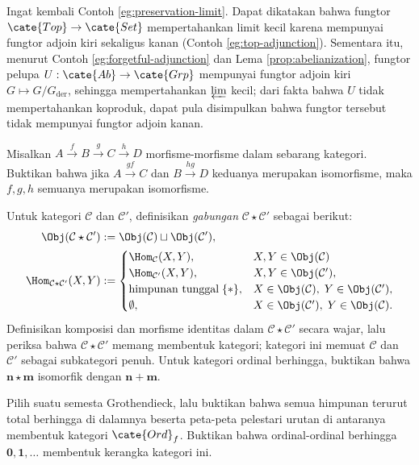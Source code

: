Ingat kembali Contoh \ref{eg:preservation-limit}. Dapat dikatakan bahwa fungtor $\cate{Top} \to \cate{Set}$ mempertahankan limit kecil karena mempunyai fungtor adjoin kiri sekaligus kanan (Contoh \ref{eg:top-adjunction}). Sementara itu, menurut Contoh \ref{eg:forgetful-adjunction} dan Lema \ref{prop:abelianization}, fungtor pelupa $U: \cate{Ab} \to \cate{Grp}$ mempunyai fungtor adjoin kiri $G \mapsto G/G_\text{der}$, sehingga mempertahankan $\varprojlim$ kecil; dari fakta bahwa $U$ tidak mempertahankan koproduk, dapat pula disimpulkan bahwa fungtor tersebut tidak mempunyai fungtor adjoin kanan.

\begin{Exercises}
	\item Misalkan $A \xrightarrow{f} B \xrightarrow{g} C \xrightarrow{h} D$ morfisme-morfisme dalam sebarang kategori. Buktikan bahwa jika $A \xrightarrow{gf} C$ dan $B \xrightarrow{hg} D$ keduanya merupakan isomorfisme, maka $f,g,h$ semuanya merupakan isomorfisme.
	\item Untuk kategori $\mathcal{C}$ dan $\mathcal{C}'$, definisikan \emph{gabungan} $\mathcal{C} \star \mathcal{C}'$ sebagai berikut:
		\begin{align*}
			\Obj(\mathcal{C} \star \mathcal{C}') & := \Obj(\mathcal{C}) \sqcup \Obj(\mathcal{C}'), \\
			\Hom_{\mathcal{C} \star \mathcal{C}'}(X, Y) & := \begin{cases}
				\Hom_{\mathcal{C}}(X, Y), & X, Y \in \Obj(\mathcal{C}) \\
				\Hom_{\mathcal{C}'}(X, Y), & X, Y \in \Obj(\mathcal{C}'), \\
				\text{himpunan tunggal}\; \{\ast\}, & X \in \Obj(\mathcal{C}), \; Y \in \Obj(\mathcal{C}'), \\
				\emptyset, & X \in \Obj(\mathcal{C}'), \; Y \in \Obj(\mathcal{C}).
			\end{cases}
		\end{align*}
		Definisikan komposisi dan morfisme identitas dalam $\mathcal{C} \star \mathcal{C}'$ secara wajar, lalu periksa bahwa $\mathcal{C} \star \mathcal{C}'$ memang membentuk kategori; kategori ini memuat $\mathcal{C}$ dan $\mathcal{C}'$ sebagai subkategori penuh. Untuk kategori ordinal berhingga, buktikan bahwa $\mathbf{n} \star \mathbf{m}$ isomorfik dengan $\mathbf{n+m}$.
	\item Pilih suatu semesta Grothendieck, lalu buktikan bahwa semua himpunan terurut total berhingga di dalamnya beserta peta-peta pelestari urutan di antaranya membentuk kategori $\cate{Ord}_f$. Buktikan bahwa ordinal-ordinal berhingga $\mathbf{0}, \mathbf{1}, \ldots$ membentuk kerangka kategori ini.

\end{Exercises}
